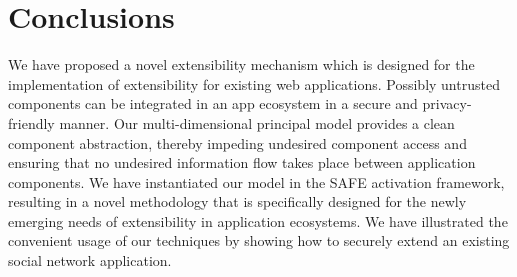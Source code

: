 \documentclass{src/acm_proc_article-sp} \else
\newcommand\SAFE{SAFE\xspace}
\begin{document}
   \section{Conclusions}\label{sec:conclusions}

We have proposed a novel extensibility mechanism which is
designed for the implementation of extensibility for
existing web applications. Possibly untrusted
components can be integrated in an app ecosystem in a secure
and privacy-friendly manner. Our multi-dimensional principal
model provides a clean component abstraction, thereby
impeding undesired component access and ensuring that no
undesired information flow takes place between application
components. We have instantiated our model in the \SAFE
activation framework, resulting in a novel methodology that
is specifically designed for the newly emerging needs of
extensibility in application ecosystems. We have illustrated
the convenient usage of our techniques by showing how to
securely extend an existing social network application.
 

  
\end{document}
